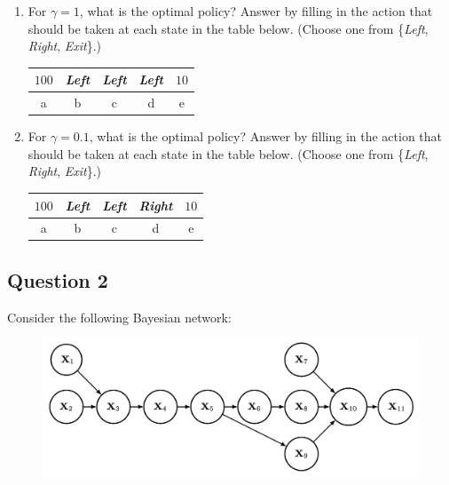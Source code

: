 \documentclass[11pt,fancychapters]{article}
\begin{document}
\begin{enumerate}[label=\textbf{(\arabic*)}]
	\item For $\gamma = 1$, what is the optimal policy? Answer by filling in the action that should be taken at each state in the table below. (Choose one from \{\textit{Left}, \textit{Right}, \textit{Exit}\}.)
	
	\begin{table}[h!]
		\centering
		\begin{tabular}{| c | c | c | c | c |} 
			\hline
			$100$ & \textit{Left} & \textit{Left} & \textit{Left} & $10$ \\
			\hline
			a & b & c & d & e \\
			\hline
		\end{tabular}
	\end{table}

	\item For $\gamma = 0.1$, what is the optimal policy? Answer by filling in the action that should be taken at each state in the table below. (Choose one from \{\textit{Left}, \textit{Right}, \textit{Exit}\}.)
	
	\begin{table}[h!]
		\centering
		\begin{tabular}{| c | c | c | c | c |} 
			\hline
			$100$ & \textit{Left} & \textit{Left} & \textit{Right} & $10$ \\
			\hline
			a & b & c & d & e \\
			\hline
		\end{tabular}
	\end{table}
\end{enumerate}

\subsection*{Question 2 {\normalfont{[12 points]}}}

Consider the following Bayesian network:

\begin{figure}[h!]
	\centering
	\includegraphics[scale=.17]{BN(a)1.png}
\end{figure}
\end{document}
